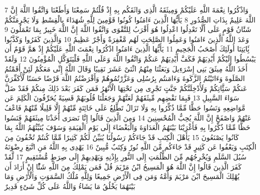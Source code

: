 {\tiny\colorbox{cl_aya}{7}} وَاذْكُرُوا نِعْمَةَ اللَّهِ عَلَيْكُمْ وَمِيثَقَهُ الَّذِى وَاثَقَكُم بِهِ إِذْ قُلْتُمْ سَمِعْنَا وَأَطَعْنَا وَاتَّقُوا اللَّهَ إِنَّ اللَّهَ عَلِيمٌ بِذَاتِ الصُّدُورِ
{\tiny\colorbox{cl_aya}{8}} يَأَيُّهَا الَّذِينَ ءَامَنُوا كُونُوا قَوَّمِينَ لِلَّهِ شُهَدَاءَ بِالْقِسْطِ وَلَا يَجْرِمَنَّكُمْ شَنََٔانُ قَوْمٍ عَلَى أَلَّا تَعْدِلُوا اعْدِلُوا هُوَ أَقْرَبُ لِلتَّقْوَى وَاتَّقُوا اللَّهَ إِنَّ اللَّهَ خَبِيرٌ بِمَا تَعْمَلُونَ
{\tiny\colorbox{cl_aya}{9}} وَعَدَ اللَّهُ الَّذِينَ ءَامَنُوا وَعَمِلُوا الصَّلِحَتِ لَهُم مَّغْفِرَةٌ وَأَجْرٌ عَظِيمٌ
{\tiny\colorbox{cl_aya}{10}} وَالَّذِينَ كَفَرُوا وَكَذَّبُوا بَِٔايَتِنَا أُولَئِكَ أَصْحَبُ الْجَحِيمِ
{\tiny\colorbox{cl_aya}{11}} يَأَيُّهَا الَّذِينَ ءَامَنُوا اذْكُرُوا نِعْمَتَ اللَّهِ عَلَيْكُمْ إِذْ هَمَّ قَوْمٌ أَن يَبْسُطُوا إِلَيْكُمْ أَيْدِيَهُمْ فَكَفَّ أَيْدِيَهُمْ عَنكُمْ وَاتَّقُوا اللَّهَ وَعَلَى اللَّهِ فَلْيَتَوَكَّلِ الْمُؤْمِنُونَ
{\tiny\colorbox{cl_aya}{12}} وَلَقَدْ أَخَذَ اللَّهُ مِيثَقَ بَنِى إِسْرَءِيلَ وَبَعَثْنَا مِنْهُمُ اثْنَىْ عَشَرَ نَقِيبًا وَقَالَ اللَّهُ إِنِّى مَعَكُمْ لَئِنْ أَقَمْتُمُ الصَّلَوةَ وَءَاتَيْتُمُ الزَّكَوةَ وَءَامَنتُم بِرُسُلِى وَعَزَّرْتُمُوهُمْ وَأَقْرَضْتُمُ اللَّهَ قَرْضًا حَسَنًا لَّأُكَفِّرَنَّ عَنكُمْ سَئَِّاتِكُمْ وَلَأُدْخِلَنَّكُمْ جَنَّتٍ تَجْرِى مِن تَحْتِهَا الْأَنْهَرُ فَمَن كَفَرَ بَعْدَ ذَلِكَ مِنكُمْ فَقَدْ ضَلَّ سَوَاءَ السَّبِيلِ
{\tiny\colorbox{cl_aya}{13}} فَبِمَا نَقْضِهِم مِّيثَقَهُمْ لَعَنَّهُمْ وَجَعَلْنَا قُلُوبَهُمْ قَسِيَةً يُحَرِّفُونَ الْكَلِمَ عَن مَّوَاضِعِهِ وَنَسُوا حَظًّا مِّمَّا ذُكِّرُوا بِهِ وَلَا تَزَالُ تَطَّلِعُ عَلَى خَائِنَةٍ مِّنْهُمْ إِلَّا قَلِيلًا مِّنْهُمْ فَاعْفُ عَنْهُمْ وَاصْفَحْ إِنَّ اللَّهَ يُحِبُّ الْمُحْسِنِينَ
{\tiny\colorbox{cl_aya}{14}} وَمِنَ الَّذِينَ قَالُوا إِنَّا نَصَرَى أَخَذْنَا مِيثَقَهُمْ فَنَسُوا حَظًّا مِّمَّا ذُكِّرُوا بِهِ فَأَغْرَيْنَا بَيْنَهُمُ الْعَدَاوَةَ وَالْبَغْضَاءَ إِلَى يَوْمِ الْقِيَمَةِ وَسَوْفَ يُنَبِّئُهُمُ اللَّهُ بِمَا كَانُوا يَصْنَعُونَ
{\tiny\colorbox{cl_aya}{15}} يَأَهْلَ الْكِتَبِ قَدْ جَاءَكُمْ رَسُولُنَا يُبَيِّنُ لَكُمْ كَثِيرًا مِّمَّا كُنتُمْ تُخْفُونَ مِنَ الْكِتَبِ وَيَعْفُوا عَن كَثِيرٍ قَدْ جَاءَكُم مِّنَ اللَّهِ نُورٌ وَكِتَبٌ مُّبِينٌ
{\tiny\colorbox{cl_aya}{16}} يَهْدِى بِهِ اللَّهُ مَنِ اتَّبَعَ رِضْوَنَهُ سُبُلَ السَّلَمِ وَيُخْرِجُهُم مِّنَ الظُّلُمَتِ إِلَى النُّورِ بِإِذْنِهِ وَيَهْدِيهِمْ إِلَى صِرَطٍ مُّسْتَقِيمٍ
{\tiny\colorbox{cl_aya}{17}} لَّقَدْ كَفَرَ الَّذِينَ قَالُوا إِنَّ اللَّهَ هُوَ الْمَسِيحُ ابْنُ مَرْيَمَ قُلْ فَمَن يَمْلِكُ مِنَ اللَّهِ شَئًْا إِنْ أَرَادَ أَن يُهْلِكَ الْمَسِيحَ ابْنَ مَرْيَمَ وَأُمَّهُ وَمَن فِى الْأَرْضِ جَمِيعًا وَلِلَّهِ مُلْكُ السَّمَوَتِ وَالْأَرْضِ وَمَا بَيْنَهُمَا يَخْلُقُ مَا يَشَاءُ وَاللَّهُ عَلَى كُلِّ شَىْءٍ قَدِيرٌ

